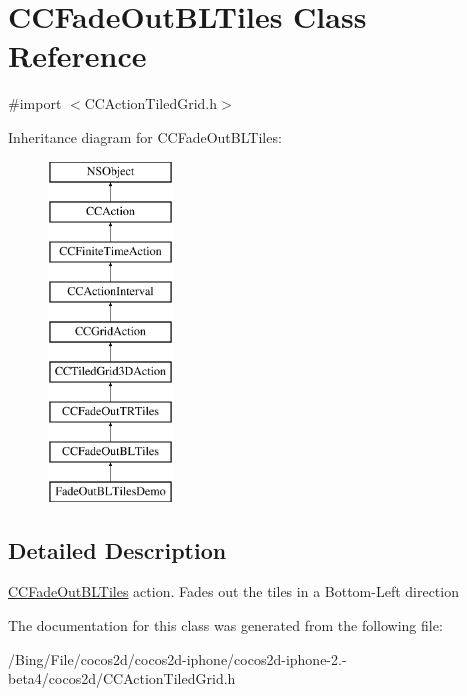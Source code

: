 \hypertarget{interface_c_c_fade_out_b_l_tiles}{\section{C\-C\-Fade\-Out\-B\-L\-Tiles Class Reference}
\label{interface_c_c_fade_out_b_l_tiles}
}


{\ttfamily \#import $<$C\-C\-Action\-Tiled\-Grid.\-h$>$}

Inheritance diagram for C\-C\-Fade\-Out\-B\-L\-Tiles\-:\begin{figure}[H]
\begin{center}
\leavevmode
\includegraphics[height=9.000000cm]{interface_c_c_fade_out_b_l_tiles}
\end{center}
\end{figure}


\subsection{Detailed Description}
\hyperlink{interface_c_c_fade_out_b_l_tiles}{C\-C\-Fade\-Out\-B\-L\-Tiles} action. Fades out the tiles in a Bottom-\/\-Left direction 

The documentation for this class was generated from the following file\-:\begin{DoxyCompactItemize}
\item 
/\-Bing/\-File/cocos2d/cocos2d-\/iphone/cocos2d-\/iphone-\/2.-\/beta4/cocos2d/C\-C\-Action\-Tiled\-Grid.\-h\end{DoxyCompactItemize}
